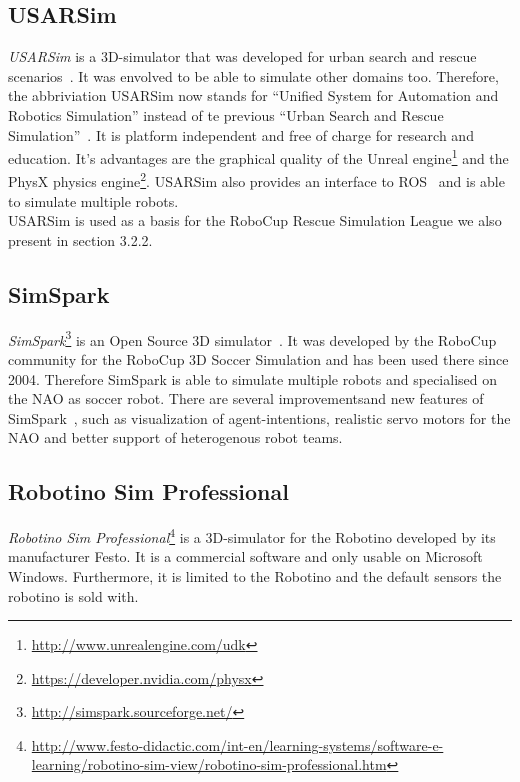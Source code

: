 \subsection{USARSim}
\textit{USARSim} is a 3D-simulator that was developed for urban search and rescue scenarios~\cite{USARSim}. It was envolved to be able to simulate other domains too. Therefore, the abbriviation USARSim now stands for ``Unified System for Automation 
and Robotics Simulation'' instead of te previous ``Urban Search and Rescue Simulation''~\cite{usarsim_new}. It is platform independent and free of charge for research and education. It's advantages are the graphical quality of the Unreal engine\footnote{\url{http://www.unrealengine.com/udk}} and the PhysX physics engine\footnote{\url{https://developer.nvidia.com/physx}}. USARSim also provides an interface to ROS~\cite{USARSimROS} and is able to simulate multiple robots.\\
USARSim is used as a basis for the RoboCup Rescue Simulation League we also present in section 3.2.2.

\subsection{SimSpark}
\textit{SimSpark}\footnote{\url{http://simspark.sourceforge.net/}} is an Open Source 3D simulator~\cite{simspark_old}. It was developed by the RoboCup community for the RoboCup 3D Soccer Simulation and has been used there since 2004. Therefore SimSpark is able to simulate multiple robots and specialised on the NAO as soccer robot. There are several improvementsand new features of SimSpark~\cite{SimSpark,Visualization}, such as visualization of agent-intentions, realistic servo motors for the NAO and better support of heterogenous robot teams.

\subsection{Robotino Sim Professional}
\textit{Robotino Sim Professional}\footnote{\url{http://www.festo-didactic.com/int-en/learning-systems/software-e-learning/robotino-sim-view/robotino-sim-professional.htm}} is a 3D-simulator for the Robotino developed by its manufacturer Festo. It is a commercial software and only usable on Microsoft Windows. Furthermore, it is limited to the Robotino and the default sensors the robotino is sold with.

